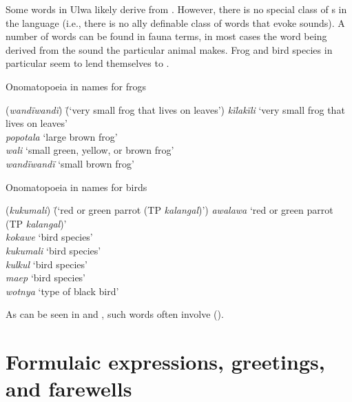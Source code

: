 Some words in Ulwa likely derive from . However, there is no special class of s in the language (i.e., there is no ally definable class of words that evoke sounds). A number of  words can be found in fauna terms, in most cases the word being derived from the sound the particular animal makes. Frog  and bird  species in particular seem to lend themselves to .

\newpage

\ea%
    \label{ex:sem:10}
          Onomatopoeia in names for frogs
\begin{tabbing}
{(\textit{wandïwandï})} \= {(‘very small frog that lives on leaves’)}\kill
{\textit{kïlakïli}} \> {‘very small frog that lives on leaves’}\\
{\textit{popotala}} \> {‘large brown frog’}\\
{\textit{wali}} \> {‘small green, yellow, or brown frog’}\\
{\textit{wandïwandï}} \> {‘small brown frog’}
\end{tabbing}
\z

\ea%
    \label{ex:sem:10a}
          Onomatopoeia in names for birds
\begin{tabbing}
{(\textit{kukumali})} \= {(‘red or green parrot (TP \textit{kalangal})’)}\kill
{\textit{awalawa}} \> {‘red or green parrot (TP \textit{kalangal})’}\\
{\textit{kokawe}} \> {‘bird species’}\\
{\textit{kukumali}} \> {‘bird species’}\\
{\textit{kulkul}} \> {‘bird species’}\\
{\textit{maep}} \> {‘bird species’}\\
{\textit{wotnya}} \> {‘type of black bird’}
\end{tabbing}
\z

As can be seen in  and , such  words often involve  ().


\section{Formulaic expressions, greetings, and farewells}\label{sec:14.4}


